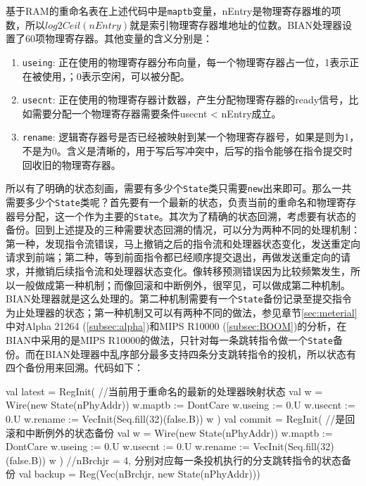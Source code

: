 基于RAM的重命名表在上述代码中是\texttt{maptb}变量，nEntry是物理寄存器堆的项数，所以$ log2Ceil(nEntry) $就是索引物理寄存器堆地址的位数。BIAN处理器设置了60项物理寄存器。其他变量的含义分别是：
\begin{enumerate}[label=(\alph*)]
	\item \texttt{useing}: 正在使用的物理寄存器分布向量，每一个物理寄存器占一位，1表示正在被使用，；0表示空闲，可以被分配。
	\item \texttt{usecnt}: 正在使用的物理寄存器计数器，产生分配物理寄存器的ready信号，比如需要分配一个物理寄存器需要条件usecnt < nEntry成立。
	\item \texttt{rename}: 逻辑寄存器号是否已经被映射到某一个物理寄存器号，如果是则为1，不是为0。含义是清晰的，用于写后写冲突中，后写的指令能够在指令提交时回收旧的物理寄存器。
\end{enumerate}

所以有了明确的状态刻画，需要有多少个\texttt{State}类只需要\texttt{new}出来即可。那么一共需要多少个\texttt{State}类呢？首先要有一个最新的状态，负责当前的重命名和物理寄存器号分配，这一个作为主要的\texttt{State}。其次为了精确的状态回溯，考虑要有状态的备份。回到上述提及的三种需要状态回溯的情况，可以分为两种不同的处理机制：第一种，发现指令流错误，马上撤销之后的指令流和处理器状态变化，发送重定向请求到前端；第二种，等到前面指令都已经顺序提交退出，再做发送重定向的请求，并撤销后续指令流和处理器状态变化。像转移预测错误因为比较频繁发生，所以一般做成第一种机制；而像回滚和中断例外，很罕见，可以做成第二种机制。BIAN处理器就是这么处理的。第二种机制需要有一个\texttt{State}备份记录至提交指令为止处理器的状态；第一种机制又可以有两种不同的做法，参见章节\ref{sec:meterial}中对Alpha 21264 (\ref{subsec:alpha})和MIPS R10000 (\ref{subsec:BOOM})的分析，在BIAN中采用的是MIPS R10000的做法，只针对每一条跳转指令做一个\texttt{State}备份。而在BIAN处理器中乱序部分最多支持四条分支跳转指令的投机，所以状态有四个备份用来回溯。代码如下：
\begin{scala}
	val latest = RegInit({ //当前用于重命名的最新的处理器映射状态
		val w = Wire(new State(nPhyAddr))
		w.maptb  := DontCare
		w.useing := 0.U
		w.usecnt := 0.U
		w.rename := VecInit(Seq.fill(32)(false.B))
		w
	})
	val commit = RegInit({ //是回滚和中断例外的状态备份
		val w = Wire(new State(nPhyAddr))
		w.maptb  := DontCare
		w.useing := 0.U
		w.usecnt := 0.U
		w.rename := VecInit(Seq.fill(32)(false.B))
		w
	})
	//nBrchjr = 4, 分别对应每一条投机执行的分支跳转指令的状态备份
	val backup = Reg(Vec(nBrchjr, new State(nPhyAddr)))
\end{scala}	


